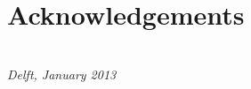 \chapter{Acknowledgements}

\begin{flushright}
	{\makeatletter\itshape
		\@author \\
		Delft, January 2013
		\makeatother}
\end{flushright}

	